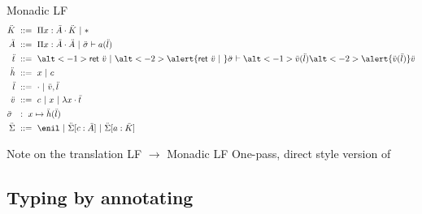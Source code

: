 \documentclass[ignorenonframetext,red]{beamer}
\begin{document}
\begin{frame}{Monadic LF}
  \inXLF
  \begin{align*}
    \mk &\gequal \prd\mv\mf\mk \gor \type \\
    \mf &\gequal \prd\mv\mf\mf \gor \ms\vdash\lapp\mcf\ma \\
    \mo &\gequal \alt<-1>{\ret\mval\gor}{\alt<-2>{\alert{\ret\mval
          \gor}}{}} \ms\vdash\alt<-1>{\lapp\mval\ma}{\alt<-2>{\alert{\lapp\mval\ma}}{\mval}} \\
    \mh &\gequal \mv \gor \mco \\
    \ma &\gequal \lnil \gor \lcons\mval\ma \\
    \mval &\gequal \mco \gor \mv \gor \ulam\mv\mo \\
    \ms\ &\ :\ \mv\mapsto{\lapp\mh\ma} \\
    \msi &\gequal { \enil \gor \ebinddecl\msi\mco\mf \gor
      \ebinddecl\msi\mcf\mk }
  \end{align*}
  \pause\pause\pause
  \begin{block}{Note on the translation LF $\to$ Monadic LF}
    One-pass, direct style version of 
  \end{block}
\end{frame}

\subsection{Typing by annotating}
\end{document}
